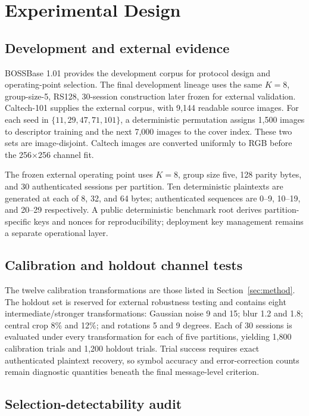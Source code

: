 \section{Experimental Design}
\label{sec:experiment}

\subsection{Development and external evidence}

BOSSBase 1.01 provides the development corpus for protocol design and operating-point selection. The final development lineage uses the same $K=8$, group-size-5, RS128, 30-session construction later frozen for external validation. Caltech-101 supplies the external corpus, with 9,144 readable source images. For each seed in $\{11,29,47,71,101\}$, a deterministic permutation assigns 1,500 images to descriptor training and the next 7,000 images to the cover index. These two sets are image-disjoint. Caltech images are converted uniformly to RGB before the 256$\times$256 channel fit.

The frozen external operating point uses $K=8$, group size five, 128 parity bytes, and 30 authenticated sessions per partition. Ten deterministic plaintexts are generated at each of 8, 32, and 64 bytes; authenticated sequences are 0--9, 10--19, and 20--29 respectively. A public deterministic benchmark root derives partition-specific keys and nonces for reproducibility; deployment key management remains a separate operational layer.

\subsection{Calibration and holdout channel tests}

The twelve calibration transformations are those listed in Section~\ref{sec:method}. The holdout set is reserved for external robustness testing and contains eight intermediate/stronger transformations: Gaussian noise 9 and 15; blur 1.2 and 1.8; central crop 8\% and 12\%; and rotations 5 and 9 degrees. Each of 30 sessions is evaluated under every transformation for each of five partitions, yielding 1,800 calibration trials and 1,200 holdout trials. Trial success requires exact authenticated plaintext recovery, so symbol accuracy and error-correction counts remain diagnostic quantities beneath the final message-level criterion.

\subsection{Selection-detectability audit}

